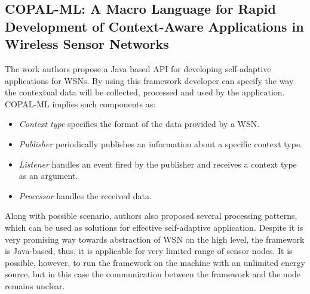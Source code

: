 \subsection{COPAL-ML: A Macro Language for Rapid Development of Context-Aware
Applications in Wireless Sensor Networks}

The work authors propose a Java based API for developing self-adaptive
applications for WSNs. By using this framework developer can specify the way the
contextual data will be collected, processed and used by the application.
COPAL-ML implies such components as:

\begin{itemize}
\item \emph{Context type} specifies the format of the data provided by a WSN.
\item \emph{Publisher} periodically publishes an information about a specific
context type.
\item \emph{Listener} handles an event fired by the publisher and receives a
context type as an argument.
\item \emph{Processor} handles the received data.
\end{itemize}

Along with possible scenario, authors also proposed several processing patterns,
which can be used as solutions for effective self-adaptive application. Despite it
is very promising way towards abstraction of WSN on the high level, the
framework is Java-based, thus, it is applicable for very limited range of sensor
nodes. It is possible, however, to run the framework on the machine with an
unlimited energy source, but in this case the communication between the
framework and the node remains unclear.